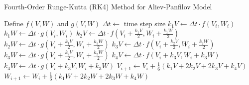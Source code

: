 \begin{algorithm}[H]
\caption{Fourth-Order Runge-Kutta (RK4) Method for Aliev-Panfilov Model}
\label{algo:Runge-Kutta}
\begin{algorithmic}
    \State Define $f(V, W)$ and $g(V, W)$ 
    \State $\Delta t \leftarrow$ time step size
     
    \State $k_1V \leftarrow \Delta t \cdot f(V_i, W_i)$
    \State $k_1W \leftarrow \Delta t \cdot g(V_i, W_i)$
    \State $k_2V \leftarrow \Delta t \cdot f\left(V_i + \frac{k_1V}{2}, W_i + \frac{k_1W}{2}\right)$
    \State $k_2W \leftarrow \Delta t \cdot g\left(V_i + \frac{k_1V}{2}, W_i + \frac{k_1W}{2}\right)$
    \State $k_3V \leftarrow \Delta t \cdot f\left(V_i + \frac{k_2V}{2}, W_i + \frac{k_2W}{2}\right)$
    \State $k_3W \leftarrow \Delta t \cdot g\left(V_i + \frac{k_2V}{2}, W_i + \frac{k_2W}{2}\right)$
    \State $k_4V \leftarrow \Delta t \cdot f\left(V_i + k_3V, W_i + k_3W\right)$
    \State $k_4W \leftarrow \Delta t \cdot g\left(V_i + k_3V, W_i + k_3W\right)$
    \State $V_{i+1} \leftarrow V_i + \frac{1}{6}(k_1V + 2k_2V + 2k_3V + k_4V)$
    \State $W_{i+1} \leftarrow W_i + \frac{1}{6}(k_1W + 2k_2W + 2k_3W + k_4W)$
    \EndFor
    \EndProcedure
\end{algorithmic}
\end{algorithm}



